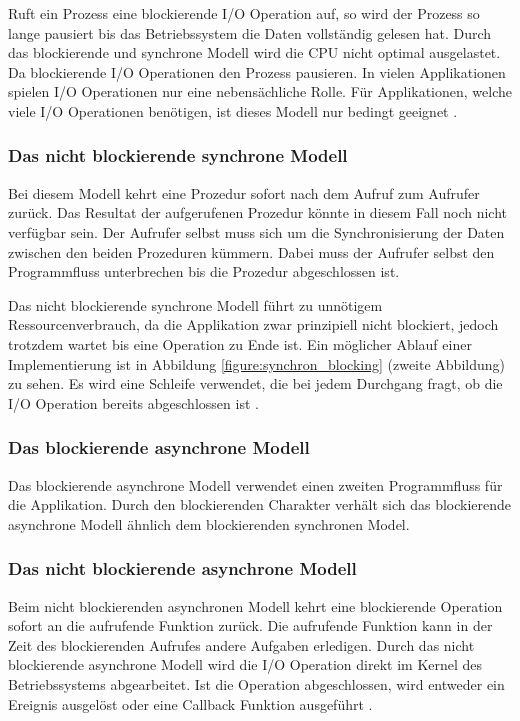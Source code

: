 Ruft ein Prozess eine blockierende I/O Operation auf, so wird der Prozess so lange pausiert bis das Betriebssystem die Daten vollständig gelesen hat. Durch das blockierende und synchrone Modell wird die CPU nicht optimal ausgelastet. Da blockierende I/O Operationen den Prozess pausieren. In vielen Applikationen spielen I/O Operationen nur eine nebensächliche Rolle. Für Applikationen, welche viele I/O Operationen benötigen, ist dieses Modell nur bedingt geeignet \cite[p. 48]{Erb2012}.


\subsubsection{Das nicht blockierende synchrone Modell}

Bei diesem Modell kehrt eine Prozedur sofort nach dem Aufruf zum Aufrufer zurück. Das Resultat der aufgerufenen Prozedur könnte in diesem Fall noch nicht verfügbar sein. Der Aufrufer selbst muss sich um die Synchronisierung der Daten zwischen den beiden Prozeduren kümmern. Dabei muss der Aufrufer selbst den Programmfluss unterbrechen bis die Prozedur abgeschlossen ist. 

Das nicht blockierende synchrone Modell führt zu unnötigem Ressourcenverbrauch, da die Applikation zwar prinzipiell nicht blockiert, jedoch trotzdem wartet bis eine Operation zu Ende ist. Ein möglicher Ablauf einer Implementierung ist in Abbildung \ref{figure:synchron_blocking} (zweite Abbildung) zu sehen. Es wird eine Schleife verwendet, die bei jedem Durchgang fragt, ob die I/O Operation bereits abgeschlossen ist \cite[p. 48]{Erb2012}.

\subsubsection{Das blockierende asynchrone Modell}

Das blockierende asynchrone Modell verwendet einen zweiten Programmfluss für die Applikation. Durch den blockierenden Charakter verhält sich das blockierende asynchrone Modell ähnlich dem blockierenden synchronen Model. 

\subsubsection{Das nicht blockierende asynchrone Modell}
Beim nicht blockierenden asynchronen Modell kehrt eine blockierende Operation sofort an die aufrufende Funktion zurück. Die aufrufende Funktion kann in der Zeit des blockierenden Aufrufes andere Aufgaben erledigen. Durch das nicht blockierende asynchrone Modell wird die I/O Operation direkt im Kernel des Betriebssystems abgearbeitet. Ist die Operation abgeschlossen, wird entweder ein Ereignis ausgelöst oder eine Callback Funktion ausgeführt \cite[p. 48]{Erb2012}.

